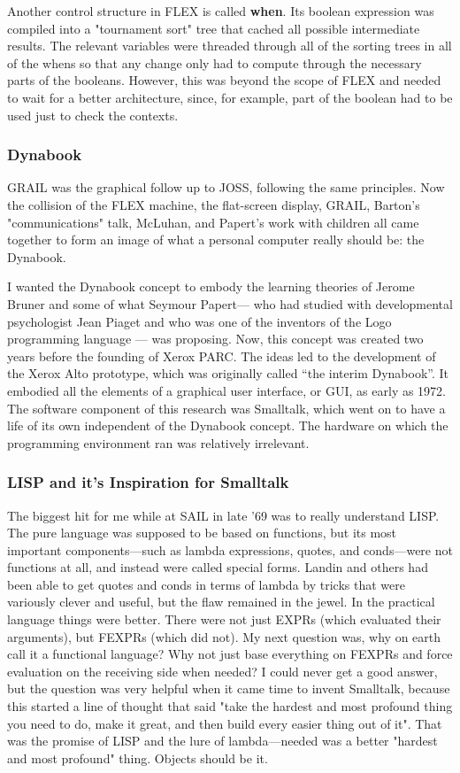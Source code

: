 \documentclass[letterpaper,12pt,parskip=full]{article}
\begin{document}
Another control structure in FLEX is called \textbf{when}.  Its boolean expression was compiled into a "tournament sort" tree that cached all possible intermediate results. The relevant variables were threaded through all of the sorting trees in all of the whens so that any change only had to compute through the necessary parts of the booleans. However, this was beyond the scope of FLEX and needed to wait for a better architecture, since, for example, part of the boolean had to be used just to check the contexts.

\subsubsection{Dynabook}

GRAIL was the graphical follow up to JOSS, following the same principles. Now the collision of the FLEX machine, the flat-screen display, GRAIL, Barton's "communications" talk, McLuhan, and Papert's work with children all came together to form an image of what a personal computer really should be: the Dynabook.

 I wanted the Dynabook concept to embody the learning theories of Jerome Bruner and some of what Seymour Papert— who had studied with developmental psychologist Jean Piaget and who was one of the inventors of the Logo programming language — was proposing. Now, this concept was created two years before the founding of Xerox PARC. The ideas led to the development of the Xerox Alto prototype, which was originally called “the interim Dynabook”. It embodied all the elements of a graphical user interface, or GUI, as early as 1972. The software component of this research was Smalltalk, which went on to have a life of its own independent of the Dynabook concept. The hardware on which the programming environment ran was relatively irrelevant.

\subsubsection{LISP and it's Inspiration for Smalltalk}

The biggest hit for me while at SAIL in late '69 was to really understand LISP. The pure language was supposed to be based on functions, but its most important components—such as lambda expressions, quotes, and conds—were not functions at all, and instead were called special forms. Landin and others had been able to get quotes and conds in terms of lambda by tricks that were variously clever and useful, but the flaw remained in the jewel. In the practical language things were better. There were not just EXPRs (which evaluated their arguments), but FEXPRs (which did not). My next question was, why on earth call it a functional language? Why not just base everything on FEXPRs and force evaluation on the receiving side when needed? I could never get a good answer, but the question was very helpful when it came time to invent Smalltalk, because this started a line of thought that said "take the hardest and most profound thing you need to do, make it great, and then build every easier thing out of it". That was the promise of LISP and the lure of lambda—needed was a better "hardest and most profound" thing. Objects should be it.
\end{document}

